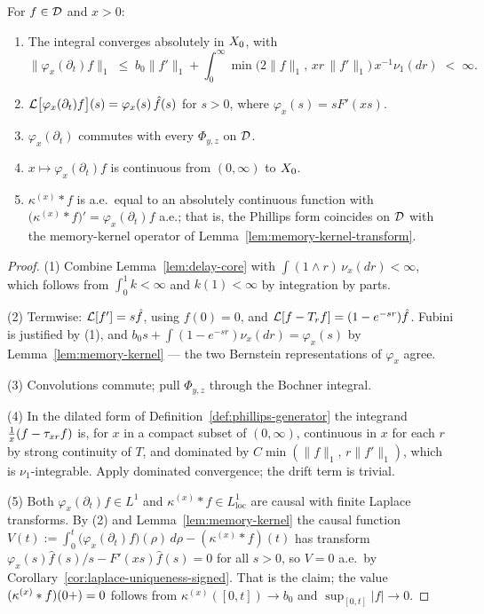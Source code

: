 \begin{lemma}\label{lem:generator-properties}
For $f \in \mathcal{D}$ and $x > 0$:
\begin{enumerate}
\item The integral converges absolutely in $X_0$, with
\[
  \|\varphi_x(\partial_t) f\|_1 \;\le\; b_0 \|f'\|_1
  + \int_0^\infty \min\bigl(2\|f\|_1,\, xr\,\|f'\|_1\bigr)\,x^{-1}\nu_1(dr) \;<\; \infty.
\]
\item $\mathcal{L}\bigl[\varphi_x(\partial_t) f\bigr](s) = \varphi_x(s)\,\hat f(s)$ for $s > 0$, where
$\varphi_x(s) = s F'(xs)$.
\item $\varphi_x(\partial_t)$ commutes with every $\Phi_{y,z}$ on $\mathcal{D}$.
\item $x \mapsto \varphi_x(\partial_t) f$ is continuous from $(0,\infty)$ to $X_0$.
\item $\kappa^{(x)} * f$ is a.e.\ equal to an absolutely continuous function with
$\bigl(\kappa^{(x)} * f\bigr)' = \varphi_x(\partial_t) f$ a.e.; that is, the Phillips form
coincides on $\mathcal{D}$ with the memory-kernel operator of Lemma~\ref{lem:memory-kernel-transform}.
\end{enumerate}
\end{lemma}

\begin{proof}
(1) Combine Lemma~\ref{lem:delay-core} with $\int (1 \wedge r)\,\nu_x(dr) < \infty$, which
follows from $\int_0^1 k < \infty$ and $k(1) < \infty$ by integration by parts.

(2) Termwise: $\mathcal{L}[f'] = s\hat f$, using $f(0) = 0$, and
$\mathcal{L}[f - T_rf] = (1 - e^{-sr})\hat f$. Fubini is justified by (1), and
$b_0 s + \int(1 - e^{-sr})\nu_x(dr) = \varphi_x(s)$ by Lemma~\ref{lem:memory-kernel} --- the
two Bernstein representations of $\varphi_x$ agree.

(3) Convolutions commute; pull $\Phi_{y,z}$ through the Bochner integral.

(4) In the dilated form of Definition~\ref{def:phillips-generator} the integrand
$\tfrac1x(f - \tau_{xr}f)$ is, for $x$ in a compact subset of $(0,\infty)$, continuous in $x$
for each $r$ by strong continuity of $T$, and dominated by $C\min(\|f\|_1,\, r\|f'\|_1)$,
which is $\nu_1$-integrable. Apply dominated convergence; the drift term is trivial.

(5) Both $\varphi_x(\partial_t)f \in L^1$ and $\kappa^{(x)} * f \in L^1_{\mathrm{loc}}$ are
causal with finite Laplace transforms. By (2) and Lemma~\ref{lem:memory-kernel} the causal
function
$V(t) := \int_0^t \bigl(\varphi_x(\partial_t)f\bigr)(\rho)\,d\rho - (\kappa^{(x)} * f)(t)$
has transform $\varphi_x(s)\hat f(s)/s - F'(xs)\hat f(s) = 0$ for all $s > 0$, so $V = 0$
a.e.\ by Corollary~\ref{cor:laplace-uniqueness-signed}. That is the claim; the value
$(\kappa^{(x)}*f)(0{+}) = 0$ follows from $\kappa^{(x)}([0,t]) \to b_0$ and
$\sup_{[0,t]}|f| \to 0$.
\end{proof}

